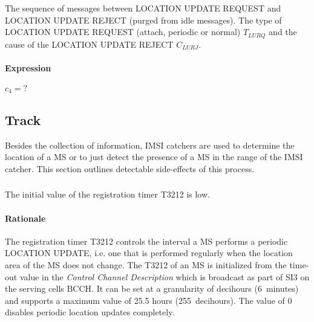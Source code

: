 \documentclass[a4paper,11pt,notitlepage,bigheadings,oneside]{scrartcl}
\begin{document}
The sequence of messages between LOCATION UPDATE REQUEST and LOCATION UPDATE
REJECT (purged from idle messages). The type of LOCATION UPDATE REQUEST
(attach, periodic or normal) $T_{LURQ}$ and the cause of the LOCATION
UPDATE REJECT $C_{LURJ}$.

\paragraph{Expression}

$c_4 = ?$


\subsection{Track}

Besides the collection of information, IMSI catchers are used to determine the
location of a MS or to just detect the presence of a MS in the range of the
IMSI catcher. This section outlines detectable side-effects of this process.

\subsubsection{}

The initial value of the registration timer T3212 is low.

\paragraph{Rationale}

The registration timer T3212 controls the interval a MS performs a periodic
LOCATION UPDATE, i.e. one that is performed regularly when the location area of
the MS does not change. The T3212 of an MS is initialized from the time-out
value in the \emph{Control Channel Description} which is broadcast as part of
SI3 on the serving cells BCCH. It can be set at a granularity of decihours
(6~minutes) and supports a maximum value of 25.5 hours (255~decihours). The
value of 0 disables periodic location updates completely.
\end{document}

